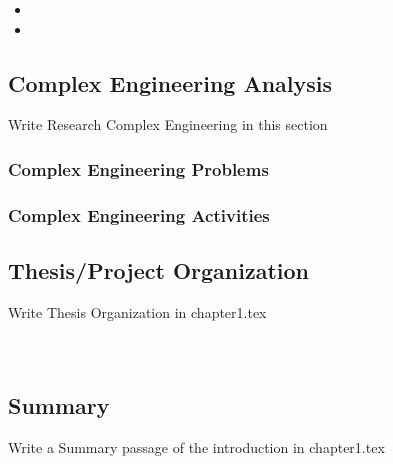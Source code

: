 \begin{itemize}

    \item 
    \item 
\end{itemize}


\subsection{Complex Engineering Analysis}
Write Research Complex Engineering in this section
\subsubsection{Complex Engineering Problems}
\subsubsection{Complex Engineering Activities}
 
\subsection{Thesis/Project Organization}
Write Thesis Organization in chapter1.tex
\\
\\
\\

\subsection*{Summary}


Write a Summary passage of the introduction in chapter1.tex 